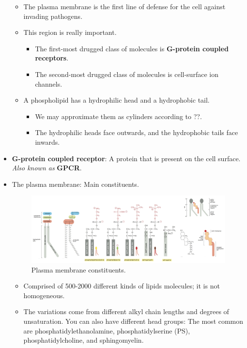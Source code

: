 \documentclass[../notes.tex]{subfiles}
\begin{document}
\begin{itemize}
\begin{itemize}
        \item The plasma membrane is the first line of defense for the cell against invading pathogens.
        \item This region is really important.
        \begin{itemize}
            \item The first-most drugged class of molecules is \textbf{G-protein coupled receptors}.
            \item The second-most drugged class of molecules is cell-surface ion channels.
        \end{itemize}
        \item A phospholipid has a hydrophilic head and a hydrophobic tail.
        \begin{itemize}
            \item We may approximate them as cylinders according to ??.
            \item The hydrophilic heads face outwards, and the hydrophobic tails face inwards.
        \end{itemize}
    \end{itemize}
    \item \textbf{G-protein coupled receptor}: A protein that is present on the cell surface. \emph{Also known as} \textbf{GPCR}.
    \item The plasma membrane: Main constituents.
    \begin{figure}[h!]
        \centering
        \includegraphics[width=0.98\linewidth]{../ExtFiles/plasmaMembraneConstituents.png}
        \caption{Plasma membrane constituents.}
        \label{fig:plasmaMembraneConstituents}
    \end{figure}
    \begin{itemize}
        \item Comprised of 500-2000 different kinds of lipids molecules; it is not homogeneous.
        \item The variations come from different alkyl chain lengths and degrees of unsaturation. You can also have different head groups: The most common are phosphatidylethanolamine, phosphatidylserine (PS), phosphatidylcholine, and sphingomyelin.

\end{itemize}
\end{itemize}
\end{document}
